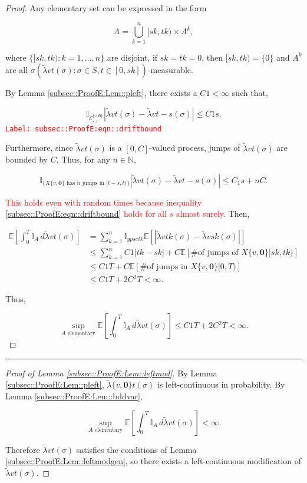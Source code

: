 \documentclass[12pt]{article}
\newcommand{\mb}{\mathbb}
\newcommand{\mc}{\mathcal}
\newcommand{\te}{\text}
\newcommand{\tr}{\textcolor{red}}
\newcommand{\labe}[1]{\tr{\texttt{Label: #1}}}
\newcommand{\lin}{\rule{\linewidth}{0.4 pt}}
\newcommand{\ex}[1]{\mb{E}\left[#1\right]}			%
\renewcommand{\root}{\mathbf{0}}				%
\renewcommand{\v}{v}							%
\renewcommand{\S}{S}							%
\newcommand{\s}{\sigma}							%
\newcommand{\T}{T}								%
\renewcommand{\t}{t}							%
\renewcommand{\tt}{s}							%
\newcommand{\X}{X}								%
\newcommand{\const}{C}							%
\newcommand{\sln}[1]{^{#1}}						%
\newcommand{\alt}[1]{\widetilde{#1}}			%
\renewcommand{\it}{k}							%
\newcommand{\evnt}{\mc{E}}						%
\newcommand{\typset}{A}							%
\newcommand{\crate}{\alt{\lambda}}				%
\begin{document}
\begin{proof}
Any elementary set can be expressed in the form

\[\typset = \bigcup_{\it = 1}^n [\tt{\it},\t{\it})\times \typset\sln{\it},\]

where \(\{[\tt{\it},\t{\it}):\it=1,\dots,n\}\) are disjoint, if \(\tt{\it} = \t{\it} = 0\), then \([\tt{\it},\t{\it}) = \{0\}\) and \(\typset\sln{\it}\) are all \(\sigma(\crate{\v}{\t}(\s):\s \in \S,\t\in [0,\tt{\it}])\)-measurable. 

By Lemma \ref{subsec::ProofE:Lem::pleft}, there exists a \(\const{1} < \infty\) such that,

\begin{equation}
\mb{I}_{\evnt{}^{\{\v,\root\}}_{\tt,\t}}|\crate{\v}{\t}(\s) - \crate{\v}{\t-\tt}(\s)| \leq \const{1}\tt.
\label{subsec::ProofE:eqn::driftbound}
\end{equation}
\labe{subsec::ProofE:eqn::driftbound}

Furthermore, since \(\crate{\v}{\t}(\s)\) is a \([0,\const{}]\)-valued process, jumps of \(\crate{\v}{\t}(\s)\) are bounded by \(\const{}\). Thus, for any \(n \in \mb{N}\),

\[\mb{I}_{\{\X{\{\v,\root\}}{}\te{ has }n\te{ jumps in } [\t-\tt,\t)\}}|\crate{\v}{\t}(\s) - \crate{\v}{\t-\tt}(\s)|\leq C_1\tt + n \const{}.\]

\tr{This holds even with random times because inequality \eqref{subsec::ProofE:eqn::driftbound} holds for all \(\tt\) almost surely.} Then,

\begin{align*}
\ex{\int_0^\T \mb{I}_\typset\,d\crate{\v}{\t}(\s)} &= \sum_{\it = 1}^n \mb{I}_{	ypset{\it}}\ex{\left|\crate{\v}{\t{k}}(\s) - \crate{\v}{\tt{\it}}(\s)\right|}\\
&\leq \sum_{\it=1}^n \const{1}|\t{\it} - \tt{\it}| + \const{}\ex{\te{\# of jumps of }\X{\{\v,\root\}}{[\tt{\it},\t{\it})}}\\
&\leq \const{1}\T + \const{}\ex{\te{\# of jumps in }\X{\{\v,\root\}}{[0,\T)}}\\
&\leq \const{1}\T + 2\const{}^2\T < \infty.
\end{align*}

Thus,

\[\sup_{\typset\te{ elementary}} \ex{\int_0^\T \mb{I}_\typset\,d\crate{\v}{\t}(\s)} \leq \const{1}\T + 2\const{}^2\T < \infty.\]
\end{proof}

\lin

\begin{proof}[Proof of Lemma \ref{subsec::ProofE:Lem::leftmod}]

By Lemma \ref{subsec::ProofE:Lem::pleft}, \(\crate{\{\v,\root\}}{\t}(\s)\) is left-continuous in probability. By Lemma \ref{subsec::ProofE:Lem::bddvar},

\[\sup_{\typset\te{ elementary}} \ex{\int_0^\T \mb{I}_{\typset}\,d\crate{\v}{\t}(\s)} < \infty.\]

Therefore \(\crate{\v}{\t}(\s)\) satisfies the conditions of Lemma \ref{subsec::ProofE:Lem::leftmodgen}, so there exists a left-continuous modification of \(\crate{\v}{\t}(\s)\).
\end{proof}
\end{document}
